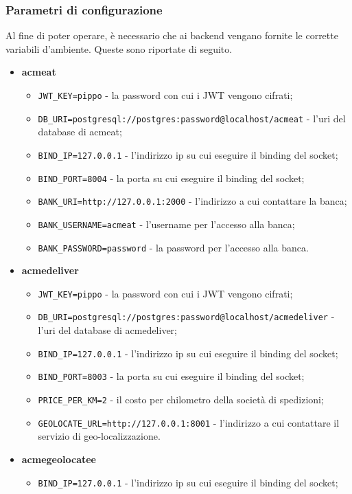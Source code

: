 \documentclass[11pt]{article} %
\begin{document}
\subsubsection{Parametri di configurazione}

Al fine di poter operare, è necessario che ai backend vengano fornite le corrette variabili d'ambiente. Queste sono riportate di seguito.
\begin{itemize}
\item \textbf{acmeat}
\begin{itemize}
\item \verb|JWT_KEY=pippo| - la password con cui i JWT vengono cifrati;
\item \verb|DB_URI=postgresql://postgres:password@localhost/acmeat| - l'uri del database di acmeat;
\item \verb|BIND_IP=127.0.0.1| - l'indirizzo ip su cui eseguire il binding del socket;
\item \verb|BIND_PORT=8004| - la porta su cui eseguire il binding del socket;
\item \verb|BANK_URI=http://127.0.0.1:2000| - l'indirizzo a cui contattare la banca;
\item \verb|BANK_USERNAME=acmeat| - l'username per l'accesso alla banca;
\item \verb|BANK_PASSWORD=password| - la password per l'accesso alla banca.
\end{itemize}
\item \textbf{acmedeliver}
\begin{itemize}
\item \verb|JWT_KEY=pippo| - la password con cui i JWT vengono cifrati;
\item \verb|DB_URI=postgresql://postgres:password@localhost/acmedeliver| - l'uri del database di acmedeliver;
\item \verb|BIND_IP=127.0.0.1| - l'indirizzo ip su cui eseguire il binding del socket;
\item \verb|BIND_PORT=8003| - la porta su cui eseguire il binding del socket;
\item \verb|PRICE_PER_KM=2| - il costo per chilometro della società di spedizioni;
\item \verb|GEOLOCATE_URL=http://127.0.0.1:8001| - l'indirizzo a cui contattare il servizio di geo-localizzazione.
\end{itemize}
\item \textbf{acmegeolocatee}
\begin{itemize}
\item \verb|BIND_IP=127.0.0.1| - l'indirizzo ip su cui eseguire il binding del socket;

\end{itemize}
\end{itemize}
\end{document}
